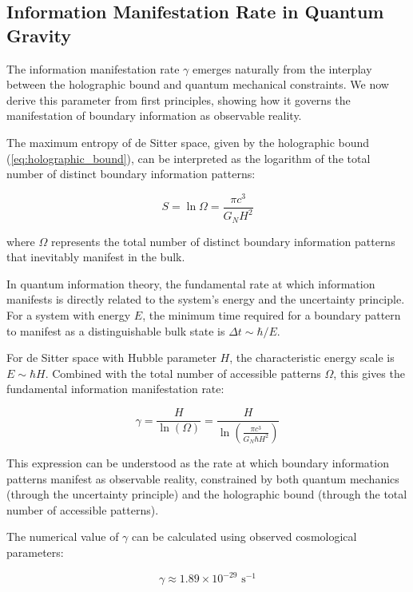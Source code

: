 \documentclass[11pt,english,twoside]{article}
\theoremstyle{plain}
\theoremstyle{definition}
\theoremstyle{remark}
\newcommand{\gammaR}{\gamma}
\begin{document}
\subsection{Information Manifestation Rate in Quantum Gravity}
\label{subsec:info_rate}

The information manifestation rate $\gammaR$ emerges naturally from the interplay between the holographic bound and quantum mechanical constraints. We now derive this parameter from first principles, showing how it governs the manifestation of boundary information as observable reality.

The maximum entropy of de Sitter space, given by the holographic bound (\ref{eq:holographic_bound}), can be interpreted as the logarithm of the total number of distinct boundary information patterns:

\begin{equation}
\label{eq:entropy_states}
S = \ln \Omega = \frac{\pi c^3}{G_N H^2}
\end{equation}

where $\Omega$ represents the total number of distinct boundary information patterns that inevitably manifest in the bulk.

In quantum information theory, the fundamental rate at which information manifests is directly related to the system's energy and the uncertainty principle. For a system with energy $E$, the minimum time required for a boundary pattern to manifest as a distinguishable bulk state is $\Delta t \sim \hbar/E$.

For de Sitter space with Hubble parameter $H$, the characteristic energy scale is $E \sim \hbar H$. Combined with the total number of accessible patterns $\Omega$, this gives the fundamental information manifestation rate:

\begin{equation}
\label{eq:gamma_def}
\gammaR = \frac{H}{\ln(\Omega)} = \frac{H}{\ln\left(\frac{\pi c^3}{G_N \hbar H^2}\right)}
\end{equation}

This expression can be understood as the rate at which boundary information patterns manifest as observable reality, constrained by both quantum mechanics (through the uncertainty principle) and the holographic bound (through the total number of accessible patterns).

The numerical value of $\gammaR$ can be calculated using observed cosmological parameters:

\begin{equation}
\label{eq:gamma_numerical}
\gammaR \approx 1.89 \times 10^{-29} \text{ s}^{-1}
\end{equation}
\end{document}

